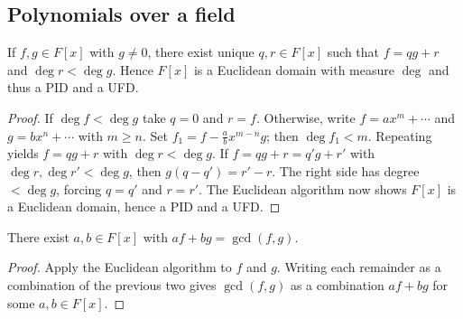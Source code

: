 \subsection{Polynomials over a field}
\begin{proposition}\label{prop:division}
If $f,g\in F[x]$ with $g\neq0$, there exist unique $q,r\in F[x]$ such that $f=qg+r$ and $\deg r<\deg g$. Hence $F[x]$ is a Euclidean domain with measure $\deg$ and thus a PID and a UFD.
\end{proposition}
\begin{proof}
If $\deg f<\deg g$ take $q=0$ and $r=f$. Otherwise, write $f=a x^m+\cdots$ and $g=b x^n+\cdots$ with $m\ge n$. Set $f_1=f-\frac{a}{b}x^{m-n}g$; then $\deg f_1<m$. Repeating yields $f=qg+r$ with $\deg r<\deg g$. If $f=qg+r=q'g+r'$ with $\deg r,\deg r'<\deg g$, then $g(q-q')=r'-r$. The right side has degree $<\deg g$, forcing $q=q'$ and $r=r'$. The Euclidean algorithm now shows $F[x]$ is a Euclidean domain, hence a PID and a UFD.
\end{proof}
\begin{corollary}
There exist $a,b\in F[x]$ with $a f + b g = \gcd(f,g)$.
\end{corollary}
\begin{proof}
Apply the Euclidean algorithm to $f$ and $g$. Writing each remainder as a combination of the previous two gives $\gcd(f,g)$ as a combination $af+bg$ for some $a,b\in F[x]$.
\end{proof}

